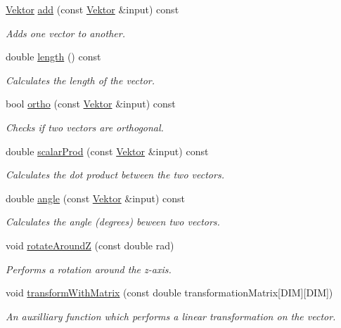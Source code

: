 \begin{DoxyCompactItemize}
\hyperlink{class_vektor}{Vektor} \hyperlink{class_vektor_aeafef3c21fdf2ad7edca844826e111bf}{add} (const \hyperlink{class_vektor}{Vektor} \&input) const
\begin{DoxyCompactList}\small\item\em Adds one vector to another. \end{DoxyCompactList}\item 
double \hyperlink{class_vektor_aa17fc7f816fc425482b17fdafc45a4ed}{length} () const
\begin{DoxyCompactList}\small\item\em Calculates the length of the vector. \end{DoxyCompactList}\item 
bool \hyperlink{class_vektor_a4624deedf4290c110ff4cfb756184f39}{ortho} (const \hyperlink{class_vektor}{Vektor} \&input) const
\begin{DoxyCompactList}\small\item\em Checks if two vectors are orthogonal. \end{DoxyCompactList}\item 
double \hyperlink{class_vektor_ad517a8ae863c578a6d46c924ff3db1d5}{scalar\+Prod} (const \hyperlink{class_vektor}{Vektor} \&input) const
\begin{DoxyCompactList}\small\item\em Calculates the dot product between the two vectors. \end{DoxyCompactList}\item 
double \hyperlink{class_vektor_a33baaca0958a73d60f19500ad59d4288}{angle} (const \hyperlink{class_vektor}{Vektor} \&input) const
\begin{DoxyCompactList}\small\item\em Calculates the angle (degrees) beween two vectors. \end{DoxyCompactList}\item 
void \hyperlink{class_vektor_a263858396c9751b803946e86947066e5}{rotate\+AroundZ} (const double rad)
\begin{DoxyCompactList}\small\item\em Performs a rotation around the z-\/axis. \end{DoxyCompactList}\item 
void \hyperlink{class_vektor_a5769002268e6bfa05c33b10839420cc2}{transform\+With\+Matrix} (const double transformation\+Matrix\mbox{[}D\+IM\mbox{]}\mbox{[}D\+IM\mbox{]})
\begin{DoxyCompactList}\small\item\em An auxilliary function which performs a linear transformation on the vector. \end{DoxyCompactList}\item 

\end{DoxyCompactItemize}
